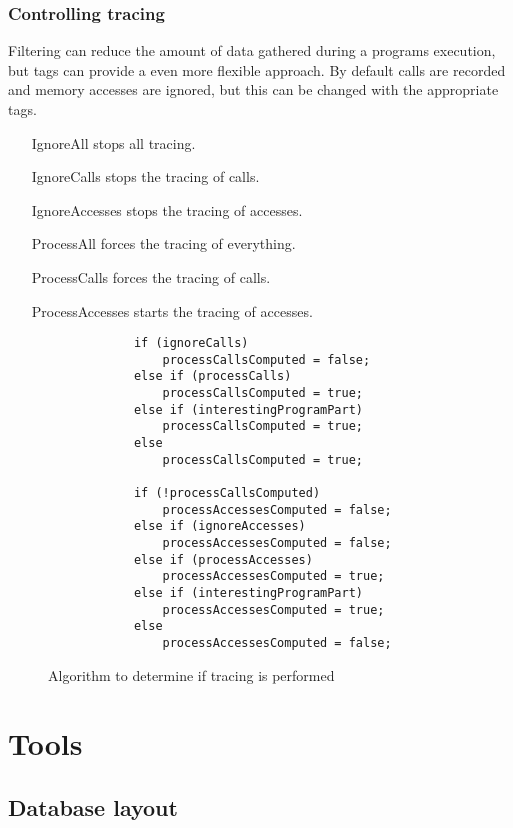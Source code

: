 \subsubsection{Controlling tracing}
Filtering can reduce the amount of data gathered during a programs execution, but tags can provide a even more flexible approach. By default calls are recorded and memory accesses are ignored, but this can be changed with the appropriate tags.

\begin{itemize}
	\item [IgnoreAll] stops all tracing.
	\item [IgnoreCalls] stops the tracing of calls.
	\item [IgnoreAccesses] stops the tracing of accesses.
	\item [ProcessAll] forces the tracing of everything.
	\item [ProcessCalls] forces the tracing of calls.
	\item [ProcessAccesses] starts the tracing of accesses.
\end{itemize}

\begin{figure}
	\begin{center}
		\begin{verbatim}
			if (ignoreCalls)
				processCallsComputed = false;
			else if (processCalls)
				processCallsComputed = true;
			else if (interestingProgramPart)
				processCallsComputed = true;
			else
				processCallsComputed = true;
			
			if (!processCallsComputed)
				processAccessesComputed = false;
			else if (ignoreAccesses)
				processAccessesComputed = false;
			else if (processAccesses)
				processAccessesComputed = true;
			else if (interestingProgramPart)
				processAccessesComputed = true;
			else
				processAccessesComputed = false;
		\end{verbatim}
	\end{center}
	\caption{Algorithm to determine if tracing is performed}
	\label{cap2:tracealg}
\end{figure}

\section{Tools}

\subsection{Database layout}

